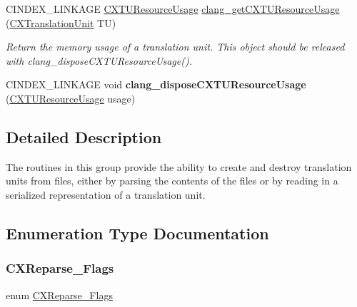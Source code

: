 \begin{DoxyCompactItemize}
\mbox{\label{group__CINDEX__TRANSLATION__UNIT_gaacd1a1e9d83aaeec6b800e701b3a53f5}} 
C\+I\+N\+D\+E\+X\+\_\+\+L\+I\+N\+K\+A\+GE \hyperlink{structCXTUResourceUsage}{C\+X\+T\+U\+Resource\+Usage} \hyperlink{group__CINDEX__TRANSLATION__UNIT_gaacd1a1e9d83aaeec6b800e701b3a53f5}{clang\+\_\+get\+C\+X\+T\+U\+Resource\+Usage} (\hyperlink{group__CINDEX_gacdb7815736ca709ce9a5e1ec2b7e16ac}{C\+X\+Translation\+Unit} TU)
\begin{DoxyCompactList}\small\item\em Return the memory usage of a translation unit. This object should be released with clang\+\_\+dispose\+C\+X\+T\+U\+Resource\+Usage(). \end{DoxyCompactList}\item 
\mbox{\label{group__CINDEX__TRANSLATION__UNIT_gad80475303ab1270d878319ae6d85ef26}} 
C\+I\+N\+D\+E\+X\+\_\+\+L\+I\+N\+K\+A\+GE void {\bfseries clang\+\_\+dispose\+C\+X\+T\+U\+Resource\+Usage} (\hyperlink{structCXTUResourceUsage}{C\+X\+T\+U\+Resource\+Usage} usage)
\end{DoxyCompactItemize}


\subsection{Detailed Description}
The routines in this group provide the ability to create and destroy translation units from files, either by parsing the contents of the files or by reading in a serialized representation of a translation unit. 

\subsection{Enumeration Type Documentation}
\mbox{\label{group__CINDEX__TRANSLATION__UNIT_gabbc92e66e3a3b22de7ead07cf01678b9}} 
\subsubsection{\texorpdfstring{C\+X\+Reparse\+\_\+\+Flags}{CXReparse\_Flags}}
{\footnotesize\ttfamily enum \hyperlink{group__CINDEX__TRANSLATION__UNIT_gabbc92e66e3a3b22de7ead07cf01678b9}{C\+X\+Reparse\+\_\+\+Flags}}



